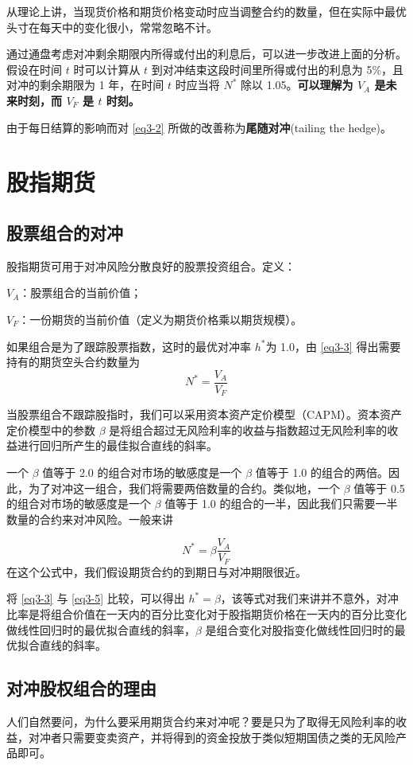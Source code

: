 从理论上讲，当现货价格和期货价格变动时应当调整合约的数量，但在实际中最优头寸在每天中的变化很小，常常忽略不计。

通过通盘考虑对冲剩余期限内所得或付出的利息后，可以进一步改进上面的分析。假设在时间 $t$ 时可以计算从 $t$ 到对冲结束这段时间里所得或付出的利息为 5\%，且对冲的剩余期限为 1 年，在时间 $t$ 时应当将 $N^*$ 除以 1.05。\textbf{可以理解为 $V_A$ 是未来时刻，而 $V_F$ 是 $t$ 时刻。}

由于每日结算的影响而对 \autoref{eq3-2} 所做的改善称为\textbf{尾随对冲}(tailing the hedge)。
\section{股指期货}
\subsection{股票组合的对冲}
股指期货可用于对冲风险分散良好的股票投资组合。定义：

$V_A$：股票组合的当前价值；

$V_F$：一份期货的当前价值（定义为期货价格乘以期货规模）。

如果组合是为了跟踪股票指数，这时的最优对冲率 $h^* $为 1.0，由 \autoref{eq3-3} 得出需要持有的期货空头合约数量为
\begin{equation}\label{eq3-4}
    N^*=\frac{V_A}{V_F}
\end{equation}

当股票组合不跟踪股指时，我们可以采用资本资产定价模型（CAPM）。资本资产定价模型中的参数 $\beta$ 是将组合超过无风险利率的收益与指数超过无风险利率的收益进行回归所产生的最佳拟合直线的斜率。

一个 $\beta$ 值等于 2.0 的组合对市场的敏感度是一个 $\beta$ 值等于 1.0 的组合的两倍。因此，为了对冲这一组合，我们将需要两倍数量的合约。类似地，一个 $\beta$ 值等于 0.5 的组合对市场的敏感度是一个 $\beta$ 值等于 1.0 的组合的一半，因此我们只需要一半数量的合约来对冲风险。一般来讲

\begin{equation}\label{eq3-5}
    N^*=\beta\frac{V_A}{V_F}
\end{equation}
在这个公式中，我们假设期货合约的到期日与对冲期限很近。

将 \autoref{eq3-3} 与 \autoref{eq3-5} 比较，可以得出 $h^*=\beta$，该等式对我们来讲并不意外，对冲比率是将组合价值在一天内的百分比变化对于股指期货价格在一天内的百分比变化做线性回归时的最优拟合直线的斜率，$\beta$ 是组合变化对股指变化做线性回归时的最优拟合直线的斜率。
\subsection{对冲股权组合的理由}
人们自然要问，为什么要采用期货合约来对冲呢？要是只为了取得无风险利率的收益，对冲者只需要变卖资产，并将得到的资金投放于类似短期国债之类的无风险产品即可。

